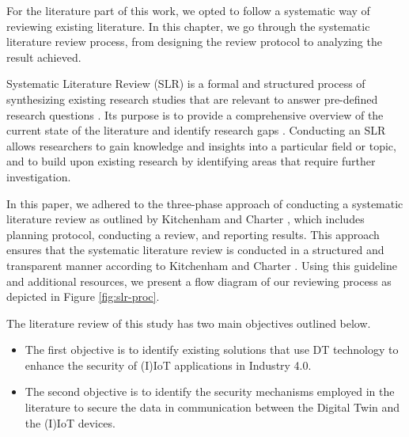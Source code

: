 
For the literature part of this work, we opted to follow a systematic way of reviewing existing literature. In this chapter, we go through the systematic literature review process, from designing the review protocol to analyzing the result achieved. 

Systematic Literature Review (SLR) is a formal and structured process of synthesizing existing research studies that are relevant to answer pre-defined research questions \cite{kitchenham_guidelines_2007}. Its purpose is to provide a comprehensive overview of the current state of the literature and identify research gaps \cite{carrera-rivera_how-conduct_2022}. Conducting an SLR allows researchers to gain knowledge and insights into a particular field or topic, and to build upon existing research by identifying areas that require further investigation.

In this paper, we adhered to the three-phase approach of conducting a systematic literature review as outlined by Kitchenham and Charter \cite{kitchenham_guidelines_2007}, which includes planning protocol, conducting a review, and reporting results. This approach ensures that the systematic literature review is conducted in a structured and transparent manner according to Kitchenham and Charter \cite{kitchenham_guidelines_2007}. Using this guideline and additional resources, we present a flow diagram of our reviewing process as depicted in Figure \ref{fig:slr-proc}. 

The literature review of this study has two main objectives outlined below.
\begin{itemize}
    \item The first objective is to identify existing solutions that use DT technology to enhance the security of (I)IoT applications in Industry 4.0. 

    \item The second objective is to identify the security mechanisms employed in the literature to secure the data in communication between the Digital Twin and the (I)IoT devices.
\end{itemize}


